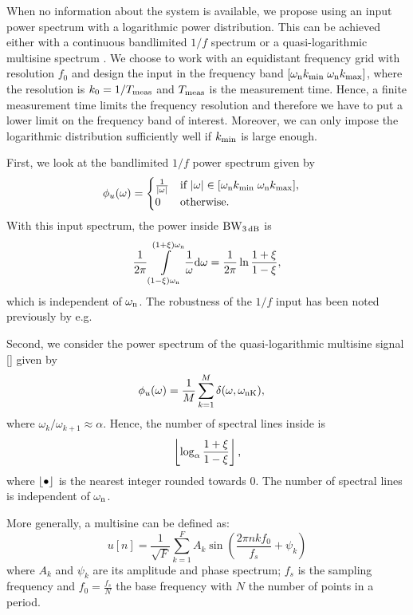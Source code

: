 When no information about the system is available, we propose using an input power spectrum with a logarithmic power distribution. This can be achieved either with a continuous bandlimited $1/f$ spectrum or a quasi-logarithmic multisine spectrum \citep{Pintelon2012}. 
We choose to work with an equidistant frequency grid with resolution $f_0$ and design the input in the frequency band $[\wn \kMin\; \wn \kMax]$, where the resolution is $k_0=1/\Tm$ and $\Tm$ is the measurement time. Hence, a finite measurement time limits the frequency resolution and therefore we have to put a lower limit on the frequency band of interest. Moreover, we can only impose the logarithmic distribution sufficiently well if $\kMin$ is large enough.

First, we look at the bandlimited $1/f$ power spectrum given by
\begin{align*}
\label{eq:excitation:pink}
\phi_u(\omega) &=\begin{cases}\frac{1}{|\omega|} &\text{if $|\omega|\in[\wn \kMin\; \wn \kMax]$,}\\
                        0           &\text{otherwise}.
            \end{cases}
\end{align*}
With this input spectrum, the power inside $\wdB$ is
\begin{align}
  \frac{1}{2\pi}
    \int\limits_{(1-\damping)\wn}^{(1+\damping)\wn}
     \frac{1}{\omega} \dd{\omega}
  = \frac{1}{2\pi}
    \ln{\frac{1+\damping}{1-\damping}},
\end{align}
which is independent of $\wn$. The robustness of the $1/f$ input has been noted previously by e.g. \cite{Rojas2007}

Second, we consider the power spectrum of the quasi-logarithmic multisine signal [\cite{Pintelon2012}] given by
\begin{align}
  \phi_u(\omega) &= \frac{1}{M}\sum_{k=1}^{M}{\delta(\omega,\wn[K])},
\end{align}
where $\omega_{k}/\omega_{k+1} \approx \alpha$.
Hence, the number of spectral lines inside \wdB is 
\begin{align}
  \floor{
    \log_{\alpha} \frac{1+\damping}{1-\damping} 
  }
  \text{,}
\end{align}
where $\floor{\placeholder}$ is the nearest integer rounded towards $0$. The number of spectral lines is independent of $\wn$. 

More generally, a multisine can be defined as:
\begin{equation}
 u \left[ n\right] = \frac{1}{\sqrt{F}}
   \sum_{k=1}^{F} 
     A_k 
     \sin 
       \left(\frac{2\pi n k f_0}{f_s} + \psi_k \right)
  \label{eq:excitation:MS}
\end{equation}
where $A_k$ and $\psi_k$ are its amplitude and phase spectrum; $f_s$ is the
sampling frequency and $f_0 = \frac{f_s}{N}$ the base frequency with $N$ the 
number of points in a period. 

